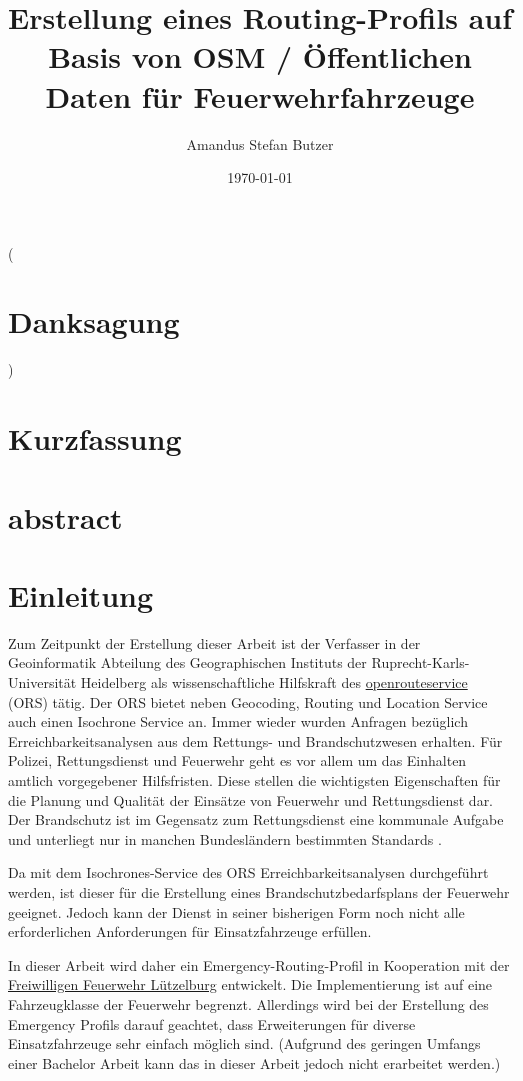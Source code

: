 \documentclass[10pt,a4paper]{article}
\author{Amandus Stefan Butzer}
\title{Erstellung eines Routing-Profils auf Basis von OSM / Öffentlichen Daten für Feuerwehrfahrzeuge}
\date{\today}
\begin{document}
\maketitle

(\section{Danksagung})

\section{Kurzfassung}

\section{abstract}

\section{Einleitung}

Zum Zeitpunkt der Erstellung dieser Arbeit ist der Verfasser in der Geoinformatik Abteilung des Geographischen Instituts der Ruprecht-Karls-Universität Heidelberg als wissenschaftliche Hilfskraft des \href{http://www.openrouteservice.org}{openrouteservice} (ORS) tätig. Der ORS bietet neben Geocoding, Routing und Location Service auch einen Isochrone Service an. Immer wieder wurden Anfragen bezüglich Erreichbarkeitsanalysen aus dem Rettungs- und Brandschutzwesen erhalten. Für Polizei, Rettungsdienst und Feuerwehr geht es vor allem um das Einhalten amtlich vorgegebener Hilfsfristen. Diese stellen die wichtigsten Eigenschaften für die Planung und Qualität der Einsätze von Feuerwehr und Rettungsdienst dar. Der Brandschutz ist im Gegensatz zum Rettungsdienst eine kommunale Aufgabe und unterliegt nur in manchen Bundesländern bestimmten Standards \cite{brandschutz bedarfsplan}.

Da mit dem Isochrones-Service des ORS Erreichbarkeitsanalysen durchgeführt werden, ist dieser für die Erstellung eines Brandschutzbedarfsplans der Feuerwehr geeignet. Jedoch kann der Dienst in seiner bisherigen Form noch nicht alle erforderlichen Anforderungen für Einsatzfahrzeuge erfüllen.

In dieser Arbeit wird daher ein Emergency-Routing-Profil in Kooperation mit der \href{https://www.feuerwehr-luetzelburg.de}{Freiwilligen Feuerwehr Lützelburg} entwickelt. Die Implementierung ist auf eine Fahrzeugklasse der Feuerwehr begrenzt. Allerdings wird bei der Erstellung des Emergency Profils darauf geachtet, dass Erweiterungen für diverse Einsatzfahrzeuge sehr einfach möglich sind. (Aufgrund des geringen Umfangs einer Bachelor Arbeit kann das in dieser Arbeit jedoch nicht erarbeitet werden.)
\end{document}

